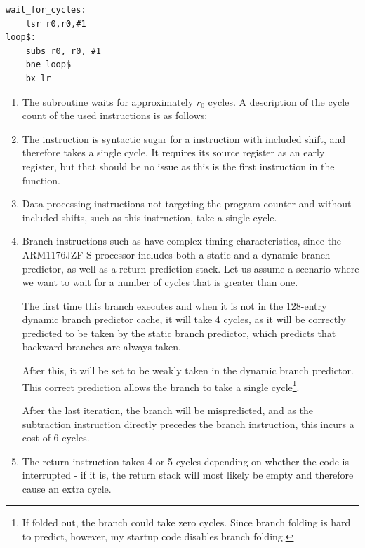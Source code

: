 \begin{lstlisting}
wait_for_cycles:
    lsr r0,r0,#1
loop$:
    subs r0, r0, #1
    bne loop$
    bx lr
\end{lstlisting}

\begin{enumerate}
    \item The  subroutine waits for approximately $r_0$ cycles. A description of the cycle count of the used instructions is as follows;
    \item The  instruction is syntactic sugar for a  instruction with included shift, and therefore takes a single cycle\cite[p. 16-7]{arm:arm1176}. It requires its source register as an early register, but that should be no issue as this is the first instruction in the function.
    \setcounter{enumi}{3}
    \item Data processing instructions not targeting the program counter and without included shifts, such as this  instruction, take a single cycle\cite[p. 16-7]{arm:arm1176}.
    \item Branch instructions such as  have complex timing characteristics, since the ARM1176JZF-S processor includes both a static and a dynamic branch predictor, as well as a return prediction stack\cite[p. 16-2]{arm:arm1176}. Let us assume a scenario where we want to wait for a number of cycles that is greater than one.

    The first time this branch executes and when it is not in the 128-entry dynamic branch predictor cache, it will take 4 cycles, as it will be correctly predicted to be taken by the static branch predictor, which predicts that backward branches are always taken\cite[p. 5-5]{arm:arm1176}.

    After this, it will be set to be weakly taken in the dynamic branch predictor. This correct prediction allows the branch to take a single cycle\footnote{If folded out, the branch could take zero cycles. Since branch folding is hard to predict, however, my startup code disables branch folding.}\cite{arm:arm1176}.

    After the last iteration, the branch will be mispredicted, and as the subtraction instruction directly precedes the branch instruction, this incurs a cost of 6 cycles.
    \item The return instruction takes 4 or 5 cycles depending on whether the code is interrupted - if it is, the return stack will most likely be empty and therefore cause an extra cycle.
\end{enumerate}

